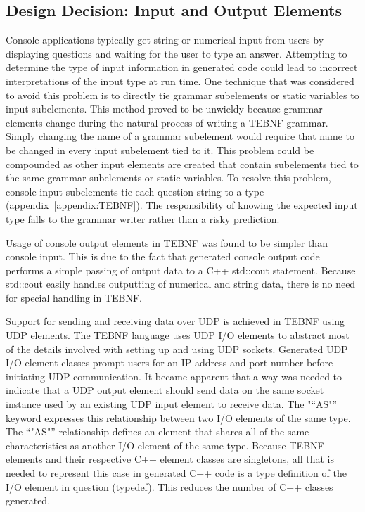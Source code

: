 \subsection{Design Decision: Input and Output Elements} \label{ssec:IoElements}
Console applications typically get string or numerical input from users by displaying questions and waiting for the user to type an answer.  Attempting to determine the type of input information in generated code could lead to incorrect interpretations of the input type at run time.  One technique that was considered to avoid this problem is to directly tie grammar subelements or static variables to input subelements.  This method proved to be unwieldy because grammar elements change during the natural process of writing a TEBNF grammar.  Simply changing the name of a grammar subelement would require that name to be changed in every input subelement tied to it.  This problem could be compounded as other input elements are created that contain subelements tied to the same grammar subelements or static variables.   To resolve this problem, console input subelements tie each question string to a type (appendix~\ref{appendix:TEBNF}).  The responsibility of knowing the expected input type falls to the grammar writer rather than a risky prediction.

\indent
Usage of console output elements in TEBNF was found to be simpler than console input.  This is due to the fact that generated console output code performs a simple passing of output data to a C++ std::cout statement.   Because std::cout easily handles outputting of numerical and string data, there is no need for special handling in TEBNF.

\indent
Support for sending and receiving data over UDP is achieved in TEBNF using UDP elements.  The TEBNF language uses UDP I/O elements to abstract most of the details involved with setting up and using UDP sockets.  Generated UDP I/O element classes prompt users for an IP address and port number before initiating UDP communication.  It became apparent that a way was needed to indicate that a UDP output element should send data on the same socket instance used by an existing UDP input element to receive data.  The "“AS"” keyword expresses this relationship between two I/O elements of the same type.  The “"AS"” relationship defines an element that shares all of the same characteristics as another I/O element of the same type.  Because TEBNF elements and their respective C++ element classes are singletons, all that is needed to represent this case in generated C++ code is a type definition of the I/O element in question (typedef).  This reduces the number of C++ classes generated.

